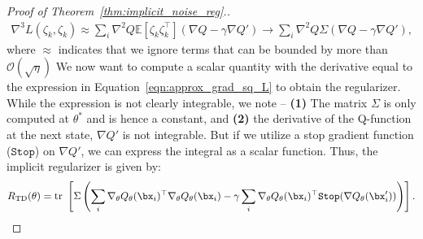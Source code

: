 \begin{proof}[Proof of Theorem~\ref{thm:implicit_noise_reg}.]
\begin{align}
\label{eqn:approx_grad_sq_L}
    \nabla^3 L (\zeta_k, \zeta_k) \approx \sum_i \nabla^2 Q \mathbb{E}[\zeta_k \zeta_k^\top] (\nabla Q - \gamma \nabla Q') \rightarrow \sum_i \nabla^2 Q \Sigma (\nabla Q - \gamma \nabla Q'),
\end{align}
where $\approx$ indicates that we ignore terms that can be bounded by more than $\mathcal{O}(\sqrt{\eta})$ We now want to compute a scalar quantity with the derivative equal to the expression in Equation~\ref{eqn:approx_grad_sq_L} to obtain the regularizer. While the expression is not clearly integrable, we note -- \textbf{(1)} The matrix $\Sigma$ is only computed at $\theta^*$ and is hence a constant, and \textbf{(2)} the derivative of the Q-function at the next state, $\nabla Q'$ is not integrable. But if we utilize a stop gradient function ($\texttt{Stop}$) on $\nabla Q'$, we can express the integral as a scalar function. Thus, the implicit regularizer is given by:
\begin{equation}
    \label{eqn:appendix_regularizer}
    R_\mathrm{TD}(\theta) = \text{tr}~\left[\Sigma \left(\sum_i \nabla_\theta Q_\theta(\bx_i)^\top \nabla_\theta Q_\theta(\bx_i) - \gamma \sum_i \nabla_\theta Q_\theta(\bx_i)^\top \texttt{Stop}(\nabla Q_\theta(\bx'_i)) \right) \right]. 
\end{equation}

\end{proof}
